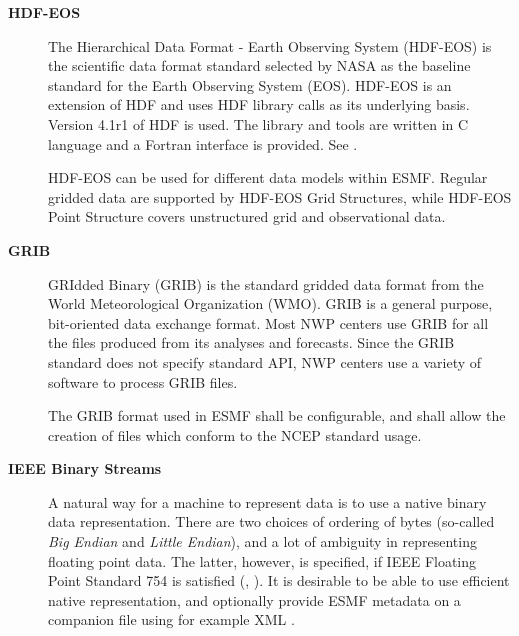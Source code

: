 \begin{description}
\item[\bf HDF-EOS]  The Hierarchical Data Format - Earth Observing
System (HDF-EOS) is the scientific data format standard selected by
NASA as the baseline standard for the Earth Observing System (EOS). HDF-EOS
is an extension of HDF and uses HDF library calls as its underlying
basis. Version 4.1r1 of HDF is used. The library and tools are written
in C language and a Fortran interface is provided. See \cite{HDF-EOS}.

HDF-EOS can be used for different data models within ESMF. Regular
gridded data are supported by HDF-EOS Grid Structures, while HDF-EOS  
Point Structure covers unstructured grid and observational data.


\item[\bf GRIB] 
GRIdded Binary (GRIB) is the standard gridded data format from the
World Meteorological Organization (WMO).  GRIB is a general purpose,
bit-oriented data exchange format. Most NWP centers use GRIB for all the 
files produced from its analyses and forecasts. Since the GRIB standard does 
not specify standard API, NWP centers use a variety of software to process 
GRIB files.

The GRIB format used in ESMF shall be configurable, and shall allow the 
creation of files which conform to the NCEP standard usage.  

\item[\bf IEEE Binary Streams]
A natural way for a machine to represent data is to use a native
binary data representation. There are two choices of ordering of bytes
(so-called {\it Big Endian} and {\it Little Endian}), and a lot of
ambiguity in representing floating point data. The latter, however, is
specified, if IEEE Floating Point Standard 754 is satisfied
(\cite{IEEE-Floating-Point}, \cite{Kahan-IEEE-754}). It is desirable
to be able to use efficient native representation, and optionally
provide ESMF metadata on a companion file using for example XML
\cite{XML-W3C}.


\end{description}
